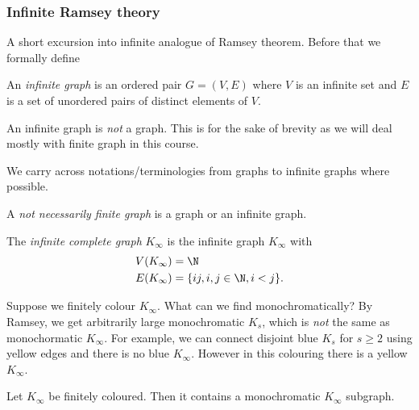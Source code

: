 \documentclass[a4paper]{article}
\begin{document}
\subsubsection{Infinite Ramsey theory}

A short excursion into infinite analogue of Ramsey theorem. Before that we formally define

\begin{definition}
  An \emph{infinite graph} is an ordered pair \(G = (V, E)\) where \(V\) is an infinite set and \(E\) is a set of unordered pairs of distinct elements of \(V\).
\end{definition}

\begin{note}
  An infinite graph is \emph{not} a graph. This is for the sake of brevity as we will deal mostly with finite graph in this course.
\end{note}

We carry across notations/terminologies from graphs to infinite graphs where possible.

A \emph{not necessarily finite graph} is a graph or an infinite graph.

\begin{definition}
  The \emph{infinite complete graph} \(K_\infty\) is the infinite graph \(K_\infty\) with
  \begin{align*}
    V(K_\infty) &= \N \\
    E(K_\infty) &= \{ij, i, j \in \N, i < j\}.
  \end{align*}
\end{definition}

Suppose we finitely colour \(K_\infty\). What can we find monochromatically? By Ramsey, we get arbitrarily large monochromatic \(K_s\), which is \emph{not} the same as monochormatic \(K_\infty\). For example, we can connect disjoint blue \(K_s\) for \(s \geq 2\) using yellow edges and there is no blue \(K_\infty\). However in this colouring there is a yellow \(K_\infty\).

\begin{theorem}
  Let \(K_\infty\) be finitely coloured. Then it contains a monochromatic \(K_\infty\) subgraph.
\end{theorem}
\end{document}
